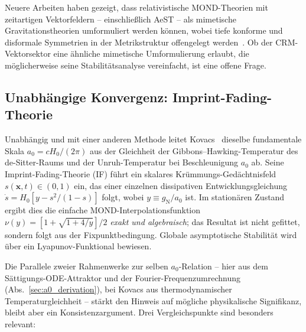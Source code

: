 \documentclass[aps,prd,twocolumn,superscriptaddress,nofootinbib]{revtex4-2}
\begin{document}
Neuere Arbeiten haben gezeigt, dass relativistische MOND-Theorien mit zeitartigen Vektorfeldern -- einschlie\ss{}lich AeST -- als mimetische Gravitationstheorien umformuliert werden k\"onnen, wobei tiefe konforme und disformale Symmetrien in der Metrikstruktur offengelegt werden~\cite{DomenechGanz2025}. Ob der CRM-Vektorsektor eine \"ahnliche mimetische Umformulierung erlaubt, die m\"oglicherweise seine Stabilit\"atsanalyse vereinfacht, ist eine offene Frage.

\subsection{Unabh\"angige Konvergenz: Imprint-Fading-Theorie}

Unabh\"angig und mit einer anderen Methode leitet Kovacs~\cite{Kovacs2026} dieselbe fundamentale Skala $a_0 = cH_0/(2\pi)$ aus der Gleichheit der Gibbons--Hawking-Temperatur des de-Sitter-Raums und der Unruh-Temperatur bei Beschleunigung $a_0$ ab. Seine Imprint-Fading-Theorie (IF) f\"uhrt ein skalares Kr\"ummungs-Ged\"achtnisfeld $s(\mathbf{x},t) \in (0,1)$ ein, das einer einzelnen dissipativen Entwicklungsgleichung $\dot{s} = H_0[y - s^2/(1-s)]$ folgt, wobei $y \equiv g_\mathrm{N}/a_0$ ist. Im station\"aren Zustand ergibt dies die einfache MOND-Interpolationsfunktion $\nu(y) = [1 + \sqrt{1+4/y}]/2$ \emph{exakt und algebraisch}; das Resultat ist nicht gefittet, sondern folgt aus der Fixpunktbedingung. Globale asymptotische Stabilit\"at wird \"uber ein Lyapunov-Funktional bewiesen.

Die Parallele zweier Rahmenwerke zur selben $a_0$-Relation -- hier aus dem S\"attigungs-ODE-Attraktor und der Fourier-Frequenzumrechnung (Abs.~\ref{sec:a0_derivation}), bei Kovacs aus thermodynamischer Temperaturgleichheit -- st\"arkt den Hinweis auf m\"ogliche physikalische Signifikanz, bleibt aber ein Konsistenzargument. Drei Vergleichspunkte sind besonders relevant:
\end{document}
